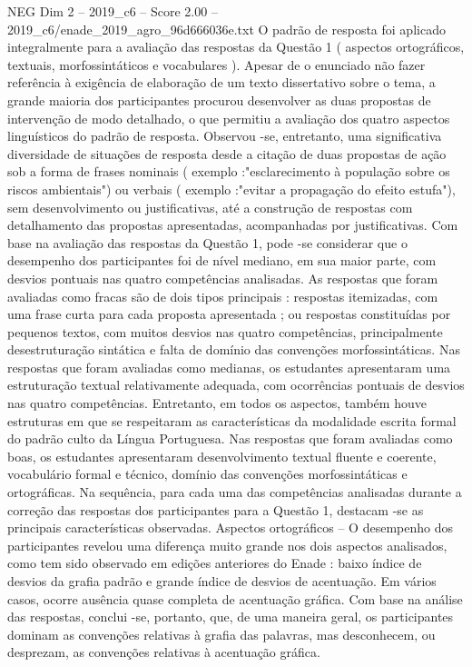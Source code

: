 \begin{textsample}{NEG Dim 2 – 2019\_c6 – Score 2.00 – 2019\_c6/enade\_2019\_agro\_96d666036e.txt}
O padrão de resposta foi aplicado integralmente para a avaliação das respostas da Questão 1 ( aspectos ortográficos, textuais, morfossintáticos e vocabulares ).
Apesar de o enunciado não fazer referência à exigência de elaboração de um texto dissertativo sobre o tema, a grande maioria dos participantes procurou desenvolver as duas propostas de intervenção de modo detalhado, o que permitiu a avaliação dos quatro aspectos linguísticos do padrão de resposta.
Observou -se, entretanto, uma significativa diversidade de situações de resposta desde a citação de duas propostas de ação sob a forma de frases nominais ( exemplo :"esclarecimento à população sobre os riscos ambientais") ou verbais ( exemplo :"evitar a propagação do efeito estufa"), sem desenvolvimento ou justificativas, até a construção de respostas com detalhamento das propostas apresentadas, acompanhadas por justificativas.
Com base na avaliação das respostas da Questão 1, pode -se considerar que o desempenho dos participantes foi de nível mediano, em sua maior parte, com desvios pontuais nas quatro competências analisadas.
As respostas que foram avaliadas como fracas são de dois tipos principais : respostas itemizadas, com uma frase curta para cada proposta apresentada ; ou respostas constituídas por pequenos textos, com muitos desvios nas quatro competências, principalmente desestruturação sintática e falta de domínio das convenções morfossintáticas.
Nas respostas que foram avaliadas como medianas, os estudantes apresentaram uma estruturação textual relativamente adequada, com ocorrências pontuais de desvios nas quatro competências.
Entretanto, em todos os aspectos, também houve estruturas em que se respeitaram as características da modalidade escrita formal do padrão culto da Língua Portuguesa.
Nas respostas que foram avaliadas como boas, os estudantes apresentaram desenvolvimento textual fluente e coerente, vocabulário formal e técnico, domínio das convenções morfossintáticas e ortográficas.
Na sequência, para cada uma das competências analisadas durante a correção das respostas dos participantes para a Questão 1, destacam -se as principais características observadas.
Aspectos ortográficos – O desempenho dos participantes revelou uma diferença muito grande nos dois aspectos analisados, como tem sido observado em edições anteriores do Enade : baixo índice de desvios da grafia padrão e grande índice de desvios de acentuação.
Em vários casos, ocorre ausência quase completa de acentuação gráfica.
Com base na análise das respostas, conclui -se, portanto, que, de uma maneira geral, os participantes dominam as convenções relativas à grafia das palavras, mas desconhecem, ou desprezam, as convenções relativas à acentuação gráfica.

\end{textsample}
